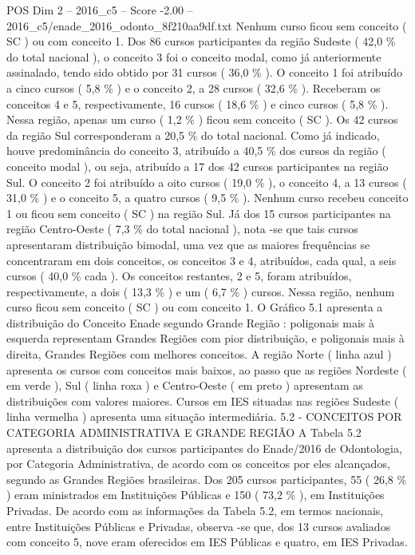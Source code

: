 \begin{textsample}{POS Dim 2 – 2016\_c5 – Score -2.00 – 2016\_c5/enade\_2016\_odonto\_8f210aa9df.txt}
Nenhum curso ficou sem conceito ( SC ) ou com conceito 1.
Dos 86 cursos participantes da região Sudeste ( 42,0 \% do total nacional ), o conceito 3 foi o conceito modal, como já anteriormente assinalado, tendo sido obtido por 31 cursos ( 36,0 \% ).
O conceito 1 foi atribuído a cinco cursos ( 5,8 \% ) e o conceito 2, a 28 cursos ( 32,6 \% ).
Receberam os conceitos 4 e 5, respectivamente, 16 cursos ( 18,6 \% ) e cinco cursos ( 5,8 \% ).
Nessa região, apenas um curso ( 1,2 \% ) ficou sem conceito ( SC ).
Os 42 cursos da região Sul corresponderam a 20,5 \% do total nacional.
Como já indicado, houve predominância do conceito 3, atribuído a 40,5 \% dos cursos da região ( conceito modal ), ou seja, atribuído a 17 dos 42 cursos participantes na região Sul.
O conceito 2 foi atribuído a oito cursos ( 19,0 \% ), o conceito 4, a 13 cursos ( 31,0 \% ) e o conceito 5, a quatro cursos ( 9,5 \% ).
Nenhum curso recebeu conceito 1 ou ficou sem conceito ( SC ) na região Sul.
Já dos 15 cursos participantes na região Centro-Oeste ( 7,3 \% do total nacional ), nota -se que tais cursos apresentaram distribuição bimodal, uma vez que as maiores frequências se concentraram em dois conceitos, os conceitos 3 e 4, atribuídos, cada qual, a seis cursos ( 40,0 \% cada ).
Os conceitos restantes, 2 e 5, foram atribuídos, respectivamente, a dois ( 13,3 \% ) e um ( 6,7 \% ) cursos.
Nessa região, nenhum curso ficou sem conceito ( SC ) ou com conceito 1.
O Gráfico 5.1 apresenta a distribuição do Conceito Enade segundo Grande Região : poligonais mais à esquerda representam Grandes Regiões com pior distribuição, e poligonais mais à direita, Grandes Regiões com melhores conceitos.
A região Norte ( linha azul ) apresenta os cursos com conceitos mais baixos, ao passo que as regiões Nordeste ( em verde ), Sul ( linha roxa ) e Centro-Oeste ( em preto ) apresentam as distribuições com valores maiores.
Cursos em IES situadas nas regiões Sudeste ( linha vermelha ) apresenta uma situação intermediária. 5.2 - CONCEITOS POR CATEGORIA ADMINISTRATIVA E GRANDE REGIÃO A Tabela 5.2 apresenta a distribuição dos cursos participantes do Enade/2016 de Odontologia, por Categoria Administrativa, de acordo com os conceitos por eles alcançados, segundo as Grandes Regiões brasileiras.
Dos 205 cursos participantes, 55 ( 26,8 \% ) eram ministrados em Instituições Públicas e 150 ( 73,2 \% ), em Instituições Privadas.
De acordo com as informações da Tabela 5.2, em termos nacionais, entre Instituições Públicas e Privadas, observa -se que, dos 13 cursos avaliados com conceito 5, nove eram oferecidos em IES Públicas e quatro, em IES Privadas.

\end{textsample}
